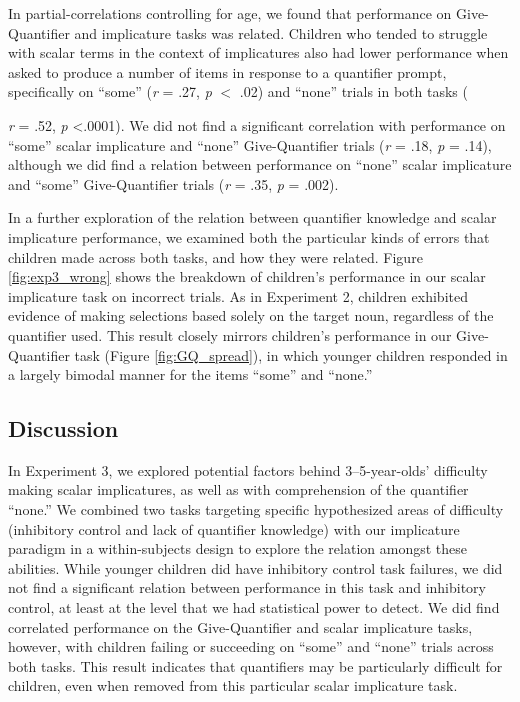 \documentclass[man]{apa2}
\begin{document}
In partial-correlations controlling for age, we found that performance on Give-Quantifier and implicature tasks was related. Children who tended to struggle with scalar terms in the context of implicatures also had lower performance when asked to produce a number of items in response to a quantifier prompt, specifically on ``some''  (\textit{r} = .27, \textit{p} $<$ .02) and ``none'' trials in both tasks ({\textit{r} = .52, \textit{p} \textless .0001). We did not find a significant correlation with performance on ``some'' scalar implicature and ``none'' Give-Quantifier trials (\textit{r} = .18, \textit{p} = .14), although we did find a relation between performance on ``none'' scalar implicature and ``some'' Give-Quantifier trials (\textit{r} = .35, \textit{p} = .002).

In a further exploration of the relation between quantifier knowledge and scalar implicature performance, we examined both the particular kinds of errors that children made across both tasks, and how they were related. Figure \ref{fig:exp3_wrong} shows the breakdown of children's performance in our scalar implicature task on incorrect trials. As in Experiment 2, children exhibited evidence of making selections based solely on the target noun, regardless of the quantifier used. This result closely mirrors children's performance in our Give-Quantifier task (Figure \ref{fig:GQ_spread}), in which younger children responded in a largely bimodal manner for the items ``some'' and ``none.''

\subsection{Discussion}

In Experiment 3, we explored potential factors behind 3--5-year-olds' difficulty making scalar implicatures, as well as with comprehension of the quantifier ``none.'' We combined two tasks targeting specific hypothesized areas of difficulty (inhibitory control and lack of quantifier knowledge) with our implicature paradigm in a within-subjects design to explore the relation amongst these abilities. While younger children did have inhibitory control task failures, we did not find a significant relation between performance in this task and inhibitory control, at least at the level that we had statistical power to detect. We did find correlated performance on the Give-Quantifier and scalar implicature tasks, however, with children failing or succeeding on ``some'' and ``none'' trials across both tasks. This result indicates that quantifiers may be particularly difficult for children, even when removed from this particular scalar implicature task.

}
\end{document}
